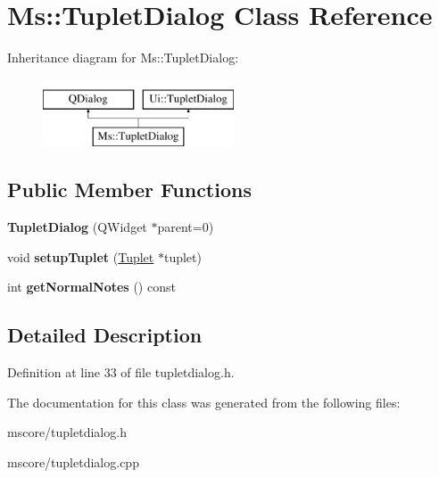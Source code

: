 \hypertarget{class_ms_1_1_tuplet_dialog}{}\section{Ms\+:\+:Tuplet\+Dialog Class Reference}
\label{class_ms_1_1_tuplet_dialog}
Inheritance diagram for Ms\+:\+:Tuplet\+Dialog\+:\begin{figure}[H]
\begin{center}
\leavevmode
\includegraphics[height=2.000000cm]{class_ms_1_1_tuplet_dialog}
\end{center}
\end{figure}
\subsection*{Public Member Functions}
\begin{DoxyCompactItemize}
\item 
\mbox{\label{class_ms_1_1_tuplet_dialog_aa7b1e88fd78c297a5df177565c09b5a1}} 
{\bfseries Tuplet\+Dialog} (Q\+Widget $\ast$parent=0)
\item 
\mbox{\label{class_ms_1_1_tuplet_dialog_a97dff329394c38d3feb64f1a5fbded02}} 
void {\bfseries setup\+Tuplet} (\hyperlink{class_ms_1_1_tuplet}{Tuplet} $\ast$tuplet)
\item 
\mbox{\label{class_ms_1_1_tuplet_dialog_a9502f1ad830724226302fdbe183ad90c}} 
int {\bfseries get\+Normal\+Notes} () const
\end{DoxyCompactItemize}


\subsection{Detailed Description}


Definition at line 33 of file tupletdialog.\+h.



The documentation for this class was generated from the following files\+:\begin{DoxyCompactItemize}
\item 
mscore/tupletdialog.\+h\item 
mscore/tupletdialog.\+cpp\end{DoxyCompactItemize}
